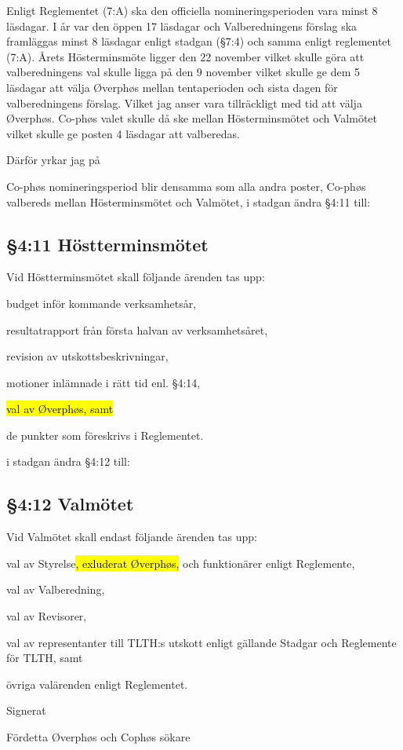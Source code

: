 \documentclass[../_main/handlingar.tex]{subfiles}
\begin{document}
Enligt Reglementet (7:A) ska den officiella nomineringsperioden vara minst 8 läsdagar. I år var den
öppen 17 läsdagar och Valberedningens förslag ska framläggas minst 8 läsdagar enligt stadgan (\S7:4)
och samma enligt reglementet (7:A). Årets Hösterminsmöte ligger den 22 november vilket skulle
göra att valberedningens val skulle ligga på den 9 november vilket skulle ge dem 5 läsdagar att välja
Øverphøs mellan tentaperioden och sista dagen för valberedningens förslag. Vilket jag anser vara
tillräckligt med tid att välja Øverphøs. Co-phøs valet skulle då ske mellan Hösterminsmötet och
Valmötet vilket skulle ge posten 4 läsdagar att valberedas.

Därför yrkar jag på
\begin{attsatser}
\att Co-phøs nomineringsperiod blir densamma som alla andra poster,
\att Co-phøs valbereds mellan Hösterminsmötet och Valmötet,
\newpage
\att i stadgan ändra \S4:11 till:
\subsection*{\S4:11 Höstterminsmötet}
Vid Höstterminsmötet skall följande ärenden tas upp:
\begin{alphlist}
    \item 	budget inför kommande verksamhetsår,
    \item 	resultatrapport från första halvan av verksamhetsåret,
    \item 	revision av utskottsbeskrivningar,
    \item 	motioner inlämnade i rätt tid enl. §4:14,
    \item   \hl{val av Øverphøs, samt}
    \item 	de punkter som föreskrivs i Reglementet.
\end{alphlist}
\att i stadgan ändra \S4:12 till:
\subsection*{\S4:12 Valmötet}
Vid Valmötet skall endast följande ärenden tas upp:
\begin{alphlist}
    \item val av Styrelse\hl{, exluderat Øverphøs,} och funktionärer enligt Reglemente,
    \item val av Valberedning,
    \item val av Revisorer,
    \item val av representanter till TLTH:s utskott enligt gällande Stadgar och
    Reglemente för TLTH, samt
    \item övriga valärenden enligt Reglementet.
\end{alphlist}
\changenote
\end{attsatser}
\begin{signatures}{1}
    Signerat
    \signature{Jonathan Benitez}{Fördetta Øverphøs och Cophøs sökare}
\end{signatures}
\end{document}
